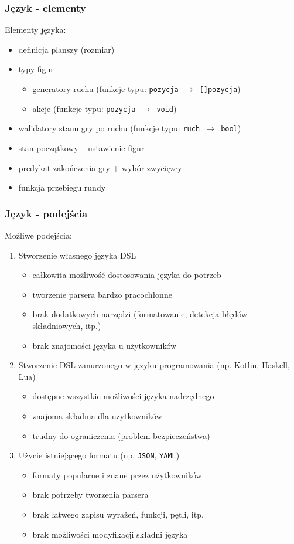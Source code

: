 \documentclass{beamer}
\newcommand\pro{\item[$+$]}
\newcommand\con{\item[$-$]}
\begin{document}
\begin{frame}
	\frametitle{Język - elementy}
	Elementy języka:
	\begin{itemize}
		\item definicja planszy (rozmiar)
		\item typy figur
		      \begin{itemize}
			      \item generatory ruchu (funkcje typu: {\tt pozycja $\rightarrow$ []pozycja})
			      \item akcje (funkcje typu: {\tt pozycja $\rightarrow$ void})
		      \end{itemize}
		\item walidatory stanu gry po ruchu (funkcje typu: {\tt ruch $\rightarrow$ bool})
		\item stan początkowy -- ustawienie figur
		\item predykat zakończenia gry + wybór zwycięzcy
		\item funkcja przebiegu rundy
	\end{itemize}
\end{frame}

\begin{frame}[allowframebreaks]
	\frametitle{Język - podejścia}
	Możliwe podejścia:
	\begin{enumerate}
		\item Stworzenie własnego języka DSL
		      \begin{itemize}
			      \pro całkowita możliwość dostosowania języka do potrzeb
			      \con tworzenie parsera bardzo pracochłonne
			      \con brak dodatkowych narzędzi (formatowanie, detekcja błędów składniowych, itp.)
			      \con brak znajomości języka u użytkowników
		      \end{itemize}
		\item Stworzenie DSL zanurzonego w języku programowania (np. Kotlin, Haskell, Lua)
		      \begin{itemize}
			      \pro dostępne wszystkie możliwości języka nadrzędnego
			      \pro znajoma składnia dla użytkowników
			      \con trudny do ograniczenia (problem bezpieczeństwa)
		      \end{itemize}
		\framebreak
		\item Użycie istniejącego formatu (np. {\tt JSON}, {\tt YAML})
		      \begin{itemize}
			      \pro formaty popularne i znane przez użytkowników
			      \pro brak potrzeby tworzenia parsera
			      \con brak łatwego zapisu wyrażeń, funkcji, pętli, itp.
			      \con brak możliwości modyfikacji składni języka
		      \end{itemize}
	\end{enumerate}
\end{frame}
\end{document}
